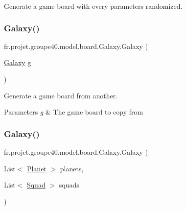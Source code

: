 Generate a game board with every parameters randomized. 

\mbox{\label{classfr_1_1projet_1_1groupe40_1_1model_1_1board_1_1_galaxy_adf41b1524b98b0fc609d3f8950aa2c62}} 
\subsubsection{\texorpdfstring{Galaxy()}{Galaxy()}\hspace{0.1cm}{\footnotesize\ttfamily [2/3]}}
{\footnotesize\ttfamily fr.\+projet.\+groupe40.\+model.\+board.\+Galaxy.\+Galaxy (\begin{DoxyParamCaption}\item[{\hyperlink{classfr_1_1projet_1_1groupe40_1_1model_1_1board_1_1_galaxy}{Galaxy}}]{g }\end{DoxyParamCaption})}



Generate a game board from another. 


\begin{DoxyParams}{Parameters}
{\em g} & The game board to copy from \\
\hline
\end{DoxyParams}
\mbox{\label{classfr_1_1projet_1_1groupe40_1_1model_1_1board_1_1_galaxy_af97d7f23693a211e91502348f0f06add}} 
\subsubsection{\texorpdfstring{Galaxy()}{Galaxy()}\hspace{0.1cm}{\footnotesize\ttfamily [3/3]}}
{\footnotesize\ttfamily fr.\+projet.\+groupe40.\+model.\+board.\+Galaxy.\+Galaxy (\begin{DoxyParamCaption}\item[{List$<$ \hyperlink{classfr_1_1projet_1_1groupe40_1_1model_1_1board_1_1_planet}{Planet} $>$}]{planets,  }\item[{List$<$ \hyperlink{classfr_1_1projet_1_1groupe40_1_1model_1_1ships_1_1_squad}{Squad} $>$}]{squads }\end{DoxyParamCaption})}




